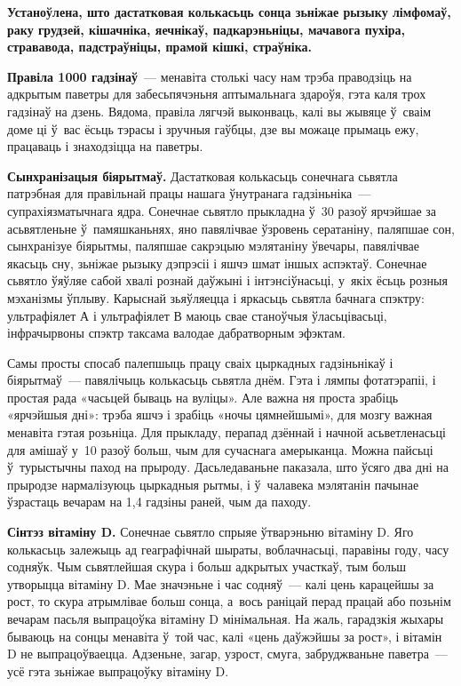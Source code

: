 \textbf{Устаноўлена, што дастатковая колькасьць сонца зьніжае рызыку лімфомаў, раку грудзей, кішачніка, яечнікаў, падкарэньніцы, мачавога пухіра, стрававода, падстраўніцы, прамой кішкі, страўніка.}

\textbf{Правіла 1000 гадзінаў}~--- менавіта столькі часу нам трэба праводзіць на адкрытым паветры для забесьпячэньня аптымальнага здароўя, гэта каля трох гадзінаў на дзень. Вядома, правіла лягчэй выконваць, калі вы жывяце ў~сваім доме ці ў~вас ёсьць тэрасы і зручныя гаўбцы, дзе вы можаце прымаць ежу, працаваць і знаходзіцца на паветры.

\textbf{Сынхранізацыя біярытмаў.} Дастатковая колькасьць сонечнага сьвятла патрэбная для правільнай працы нашага ўнутранага гадзіньніка~--- супрахіязматычнага ядра. Сонечнае сьвятло прыкладна ў~30 разоў ярчэйшае за асьвятленьне ў~памяшканьнях, яно павялічвае ўзровень сератаніну, паляпшае сон, сынхранізуе біярытмы, паляпшае сакрэцыю мэлятаніну ўвечары, павялічвае якасьць сну, зьніжае рызыку дэпрэсіі і яшчэ шмат іншых аспэктаў. Сонечнае сьвятло ўяўляе сабой хвалі рознай даўжыні і інтэнсіўнасьці, у~якіх ёсьць розныя мэханізмы ўплыву. Карыснай зьяўляецца і яркасьць сьвятла бачнага спэктру: ультрафіялет А і ультрафіялет В маюць свае станоўчыя ўласьцівасьці, інфрачырвоны спэктр таксама валодае дабратворным эфэктам.

Самы просты спосаб палепшыць працу сваіх цыркадных гадзіньнікаў і біярытмаў~--- павялічыць колькасьць сьвятла днём. Гэта і лямпы фотатэрапіі, і простая рада «часьцей бываць на вуліцы». Але важна ня проста зрабіць «ярчэйшыя дні»: трэба яшчэ і зрабіць «ночы цямнейшымі», для мозгу важная менавіта гэтая розьніца. Для прыкладу, перапад дзённай і начной асьветленасьці для амішаў у~10 разоў больш, чым для сучаснага амерыканца. Можна пайсьці ў~турыстычны паход на прыроду. Дасьледаваньне паказала, што ўсяго два дні на прыродзе нармалізуюць цыркадныя рытмы, і ў~чалавека мэлятанін пачынае ўзрастаць вечарам на 1,4 гадзіны раней, чым да паходу.

\textbf{Сінтэз вітаміну D.} Сонечнае сьвятло спрыяе ўтварэньню вітаміну D. Яго колькасьць залежыць ад геаграфічнай шыраты, воблачнасьці, паравіны году, часу содняўк. Чым сьвятлейшая скура і больш адкрытых участкаў, тым больш утворыцца вітаміну D. Мае значэньне і час содняў~--- калі цень карацейшы за рост, то скура атрымлівае больш сонца, а~вось раніцай перад працай або позьнім вечарам пасьля выпрацоўка вітаміну D мінімальная. На жаль, гарадзкія жыхары бываюць на сонцы менавіта ў~той час, калі «цень даўжэйшы за рост», і вітамін D не выпрацоўваецца. Адзеньне, загар, узрост, смуга, забруджваньне паветра~--- усё гэта зьніжае выпрацоўку вітаміну D.

